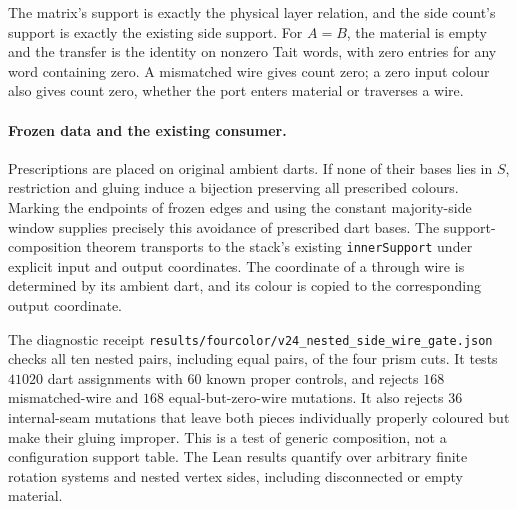 The matrix's support is exactly the physical layer relation, and the
side count's support is exactly the existing side support.
For $A=B$, the material is empty and the transfer is the identity on
nonzero Tait words, with zero entries for any word containing zero.
A mismatched wire gives count zero; a zero input colour also gives
count zero, whether the port enters material or traverses a wire.

\paragraph{Frozen data and the existing consumer.}
Prescriptions are placed on original ambient darts.  If none of their
bases lies in $S$, restriction and gluing induce a bijection preserving
all prescribed colours.
Marking the endpoints of frozen edges and using the constant majority-side
window supplies precisely this avoidance of prescribed dart bases.
The support-composition theorem transports to the stack's existing
\texttt{innerSupport} under explicit input and output coordinates.
The coordinate of a through wire is determined by its ambient dart,
and its colour is copied to the corresponding output coordinate.

The diagnostic receipt
\texttt{results/fourcolor/v24\_nested\_side\_wire\_gate.json}
checks all ten nested pairs, including equal pairs, of the four prism
cuts.  It tests $41020$ dart assignments with $60$ known proper controls,
and rejects $168$ mismatched-wire and $168$ equal-but-zero-wire mutations.
It also rejects $36$ internal-seam mutations that leave both pieces
individually properly coloured but make their gluing improper.
This is a test of generic composition, not a configuration support table.
The Lean results quantify over arbitrary finite rotation systems and
nested vertex sides, including disconnected or empty material.

